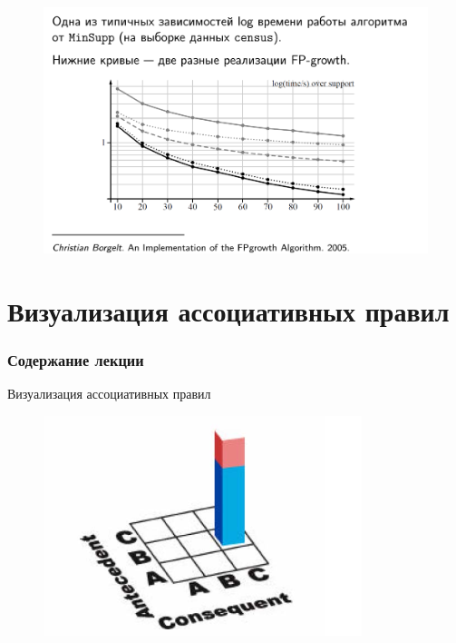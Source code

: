 \documentclass{beamer}
\begin{document}
\begin{frame}
	\begin{figure}[h]
		\centering
		\includegraphics[scale=0.45]{images/lec08-pic47.png}
	\end{figure}
\end{frame}

\section{Визуализация ассоциативных правил}

\begin{frame}
  \frametitle{Содержание лекции}
  \tableofcontents[current]
\end{frame}

\begin{frame}{Визуализация ассоциативных правил}
	\begin{figure}[h]
		\centering
		\includegraphics[scale=0.7]{images/lec08-pic27.png}
	\end{figure}
\end{frame}
\end{document}

